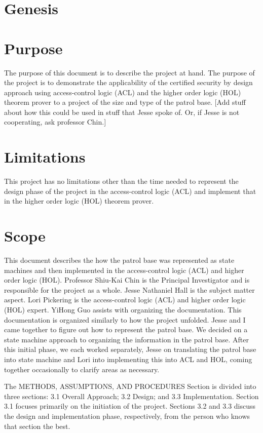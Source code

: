 
\section*{Genesis}
\label{sec:genesis}

\section*{Purpose}
\label{sec:purpose}

The purpose of this document is to describe the project at hand.
The purpose of the project is to demonstrate the applicability of the
certified security by design approach using access-control logic (ACL)
and the higher order logic (HOL) theorem prover to a project of the
size and type of the patrol base. [Add stuff about how this could be
used in stuff that Jesse spoke of. Or, if Jesse is not cooperating,
ask professor Chin.]

\section*{Limitations}
\label{sec:limitations}
This project has no limitations other than the time needed to represent
the design phase of the project in the access-control logic (ACL) and
implement that in the higher order logic (HOL) theorem prover.

\section*{Scope}
\label{sec:scope}

This document describes the how the patrol base was represented as state
machines and then implemented in the access-control logic (ACL) and higher
order logic (HOL). Professor Shiu-Kai Chin is the Principal Investigator
and is responsible for the project as a whole. Jesse Nathaniel Hall is the
subject matter aspect. Lori Pickering is the access-control logic (ACL)
and higher order logic (HOL) expert. YiHong Guo assists with organizing
the documentation. This documentation is organized similarly to how the
project unfolded. Jesse and I came together to figure out how to represent
the patrol base. We decided on a state machine approach to organizing the
information in the patrol base. After this initial phase, we each worked
separately, Jesse on translating the patrol base into state machine and
Lori into implementing this into ACL and HOL, coming together occasionally
to clarify areas as necessary.

The METHODS, ASSUMPTIONS, AND PROCEDURES Section is divided into three
sections: 3.1 Overall Approach; 3.2 Design; and 3.3 Implementation. Section
3.1 focuses primarily on the initiation of the project. Sections 3.2 and
3.3 discuss the design and implementation phase, respectively, from the
person who knows that section the best.

